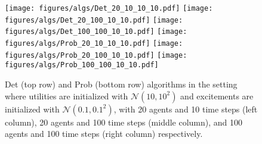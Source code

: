 \begin{figure}
    \centering
    \texttt{[image: figures/algs/Det\_20\_10\_10\_10.pdf]}
    \texttt{[image: figures/algs/Det\_20\_100\_10\_10.pdf]}
    \texttt{[image: figures/algs/Det\_100\_100\_10\_10.pdf]}
    \texttt{[image: figures/algs/Prob\_20\_10\_10\_10.pdf]}
    \texttt{[image: figures/algs/Prob\_20\_100\_10\_10.pdf]}
    \texttt{[image: figures/algs/Prob\_100\_100\_10\_10.pdf]}
    \caption{Det (top row) and Prob (bottom row) algorithms in the setting where utilities are initialized with $\mathcal{N}(10, 10^2)$ and excitements are initialized with $\mathcal{N}(0.1, 0.1^2)$, with 20 agents and 10 time steps (left column), 20 agents and 100 time steps (middle column), and 100 agents and 100 time steps (right column) respectively.}
    \label{fig:algs}
\end{figure}